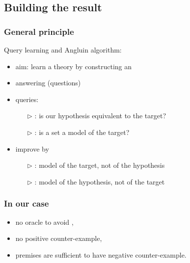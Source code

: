 \subsection{Building the result}

\begin{frame}
\frametitle{General principle}

Query learning and Angluin algorithm:
\begin{itemize}
	\item aim: learn a theory by constructing an 
	\item {} answering  (questions)
	\item queries:
		\begin{itemize}
			\item[\color{belize} $\triangleright$]
			 {\color{midnight} : is our hypothesis equivalent to the target?}
			\item[\color{belize} $\triangleright$]
			{\color{midnight} : is a set a model of the target?}
		\end{itemize}
	\item improve by 
		\begin{itemize}
			\item[\color{belize} $\triangleright$]
			{\color{midnight} : model of the target, not of the hypothesis}
			\item[\color{belize} $\triangleright$]
			{\color{midnight} : model of the hypothesis, not
			of the target}
		\end{itemize}
\end{itemize}


\end{frame}

\begin{frame}
\frametitle{In our case}

\begin{itemize}
	\item no oracle to avoid ,
	
	\vspace{1.2em}
	
	\item no positive counter-example,
	
	\vspace{1.2em}
	
	\item premises are sufficient to have negative counter-example.
\end{itemize}



\end{frame}

